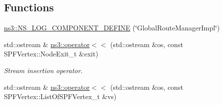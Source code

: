 \subsection*{Functions}
\begin{DoxyCompactItemize}
\item 
\hyperlink{namespacens3_a9f5e7e59c5c23d1784a6e1acce93aeca}{ns3\+::\+N\+S\+\_\+\+L\+O\+G\+\_\+\+C\+O\+M\+P\+O\+N\+E\+N\+T\+\_\+\+D\+E\+F\+I\+NE} (\char`\"{}Global\+Route\+Manager\+Impl\char`\"{})
\item 
std\+::ostream \& \hyperlink{namespacens3_a641b564ed585927763b294810e422865}{ns3\+::operator$<$$<$} (std\+::ostream \&os, const S\+P\+F\+Vertex\+::\+Node\+Exit\+\_\+t \&exit)
\begin{DoxyCompactList}\small\item\em Stream insertion operator. \end{DoxyCompactList}\item 
std\+::ostream \& \hyperlink{namespacens3_a2526fcf25af0f4bac64d0140a7daa1bd}{ns3\+::operator$<$$<$} (std\+::ostream \&os, const S\+P\+F\+Vertex\+::\+List\+Of\+S\+P\+F\+Vertex\+\_\+t \&vs)
\end{DoxyCompactItemize}
